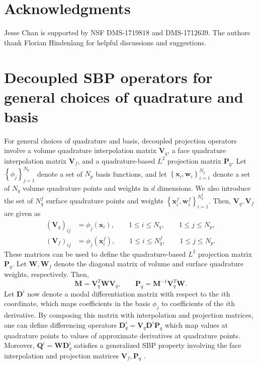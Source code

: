 \documentclass[onefignum,onetabnum,final]{siamart171218}
\newcommand{\LRp}[1]{\left( #1 \right)}
\newcommand{\LRc}[1]{\left\{ #1 \right\}}
\newcommand{\note}[1]{{\color{blue}{#1}}}
\begin{document}

\section{Acknowledgments}

Jesse Chan is supported by NSF DMS-1719818 and DMS-1712639.  The authors thank Florian Hindenlang for helpful discussions and suggestions.

\appendix

\section{Decoupled SBP operators for general choices of quadrature and basis}
\label{app:decoupled}

For general choices of quadrature and basis, decoupled projection operators involve a volume quadrature interpolation matrix $\bm{V}_q$, a face quadrature interpolation matrix $\bm{V}_f$, and a quadrature-based $L^2$ projection matrix $\bm{P}_q$.  Let $\LRc{\phi_j}_{j=1}^{N_p}$ denote a set of $N_p$ basis functions, and let $\LRc{\bm{x}_i, \bm{w}_i}_{i = 1}^{N_q}$ denote a set of $N_q$ volume quadrature points and weights in $d$ dimensions.  We also introduce the set of $N^f_q$ surface quadrature points and weights $\LRc{\bm{x}^f_i, \bm{w}^f_i}_{i=1}^{N^f_q}$.  
Then, $\bm{V}_q, \bm{V}_f$ are given as 
\begin{align*}
\LRp{\bm{V}_q}_{ij} &= \phi_j(\bm{x}_i), \qquad 1 \leq i \leq N_q, \qquad 1 \leq j \leq N_p,\\
\LRp{\bm{V}_f}_{ij} &= \phi_j\LRp{\bm{x}^f_i}, \qquad 1 \leq i \leq N^f_q, \qquad 1\leq j \leq N_p.
\end{align*}
These matrices can be used to define the quadrature-based $L^2$ projection matrix $\bm{P}_q$.  Let $\bm{W}, \bm{W}_f$ denote the diagonal matrix of volume and surface quadrature weights, respectively.  Then, 
\[
\bm{M} = \bm{V}_q^T\bm{W}\bm{V}_q, \qquad \bm{P}_q = \bm{M}^{-1}\bm{V}_q^T\bm{W}.  
\]
Let $\bm{D}^i$ now denote a modal differentiation matrix with respect to the $i$th coordinate, which maps coefficients in the basis $\phi_j$ to coefficients of the $i$th derivative.  By composing this matrix with interpolation and projection matrices, one can define differencing operators $\bm{D}_q^i = \bm{V}_q\bm{D}^i\bm{P}_q$ which map values at quadrature points to values of approximate derivatives at quadrature points.  Moreover, $\bm{Q}^i = \bm{W}\bm{D}_q^i$ satisfies a generalized SBP property involving the face interpolation and projection matrices $\bm{V}_f, \bm{P}_q$ \cite{chan2017discretely}.  
\end{document}
